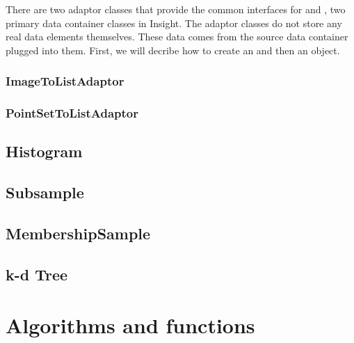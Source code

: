 There are two adaptor classes that provide the common
 interfaces for  and
, two primary data container classes in Insight. The
adaptor classes do not store any real data elements themselves. These
data comes from the source data container plugged into them. First, we
will decribe how to create an
 and then an
 object.

\subsubsection{ImageToListAdaptor}
\label{sec:ImageToListAdaptor}



\subsubsection{PointSetToListAdaptor}
\label{sec:PointSetToListAdaptor}



\subsection{Histogram}
\label{sec:Histogram}



\subsection{Subsample}
\label{sec:Subsample}



\subsection{MembershipSample}
\label{sec:MembershipSample}



\subsection{k-d Tree}
\label{sec:KdTree}



\section{Algorithms and functions}
\label{sec:StatisticsAlgorithmsFunctions}

